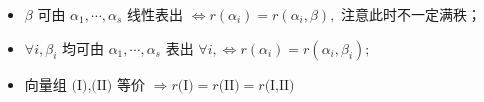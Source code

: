 
\begin{itemize}
    \item $ \beta $ 可由 $ \alpha_1,\cdots,\alpha_s $ 线性表出 $ \Leftrightarrow r(\alpha_i) = r(\alpha_i,\beta), $ 
    注意此时不一定满秩；
    \item $ \forall i, \beta_i $ 均可由 $ \alpha_1,\cdots,\alpha_s $ 表出
    $\forall i, \Leftrightarrow r(\alpha_i) = r(\alpha_i,\beta_i); $ 
    \item 向量组 $ \textrm{(I),(II)} $ 等价
    $ \Rightarrow r\textrm{(I)}=r\textrm{(II)}=r\textrm{(I,II)} $ 
\end{itemize}

